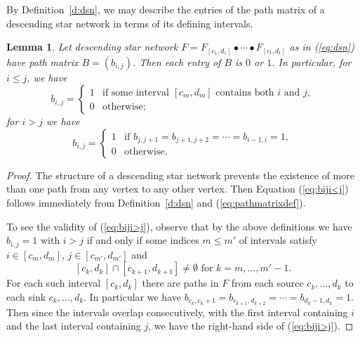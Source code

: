 \documentclass[12pt]{amsart}
\newtheorem{lem}[thm]{Lemma}
\theoremstyle{definition}
\numberwithin{equation}{section}
\begin{document}
By Definition~\ref{d:dsn}, we may describe the entries of
the path matrix of a descending star network
in terms of its defining intervals.
\begin{lem}\label{l:dsn}
  Let
  descending star network
  $F = F_{[c_1,d_1]} \bullet \cdots \bullet F_{[c_t,d_t]}$ as in (\ref{eq:dsn})
  have path matrix $B = (b_{i,j})$.
  Then each entry of $B$ is $0$ or $1$.  In particular,
  for $i \leq j$, we have
  \begin{equation}\label{eq:biji<j}
    b_{i,j} = \begin{cases}
      1 &\text{if some interval $[c_m,d_m]$ contains both $i$ and $j$},\\
      0 &\text{otherwise};
    \end{cases}
  \end{equation}
  for $i > j$ we have
  \begin{equation}\label{eq:biji>j}
    b_{i,j} = \begin{cases}
      1 &\text{if $b_{j,j+1} = b_{j+1,j+2} = \cdots = b_{i-1,i} = 1$},\\
      0 &\text{otherwise}.%
    \end{cases}
  \end{equation}
\end{lem}
\begin{proof}
  The structure of a descending star network prevents the existence of
  more than one path from any vertex to any other vertex.
  Then
  Equation (\ref{eq:biji<j}) follows immediately from Definition~\ref{d:dsn}
  and
  (\ref{eq:pathmatrixdef}).

  To see the validity of (\ref{eq:biji>j}), observe that
  by the above definitions we have $b_{i,j} = 1$ with $i > j$ if and only if
  some indices $m \leq m'$ of intervals satisfy
  $i \in [c_m,d_m]$,
  $j \in [c_{m'},d_{m'}]$
  and
  \begin{equation}\label{eq:intersectingintervals}
  [c_k,d_k] \cap [c_{k+1},d_{k+1}] \neq \emptyset
  \text{ for $k = m,\dotsc,m'-1$}.
  \end{equation}
  For each such interval $[c_k,d_k]$ there are paths in $F$ from each
  source $c_k,\dotsc,d_k$ to each sink $c_k,\dotsc,d_k$.  In particular
  we have $b_{c_k,c_k+1} = b_{c_{k+1},d_{k+2}} = \cdots = b_{d_k-1,d_k} = 1$.
  Then since the intervals overlap consecutively,
  with the first interval containing $i$
  and the last interval containing $j$, we have the right-hand side of
  (\ref{eq:biji>j}).
\end{proof}
\end{document}
